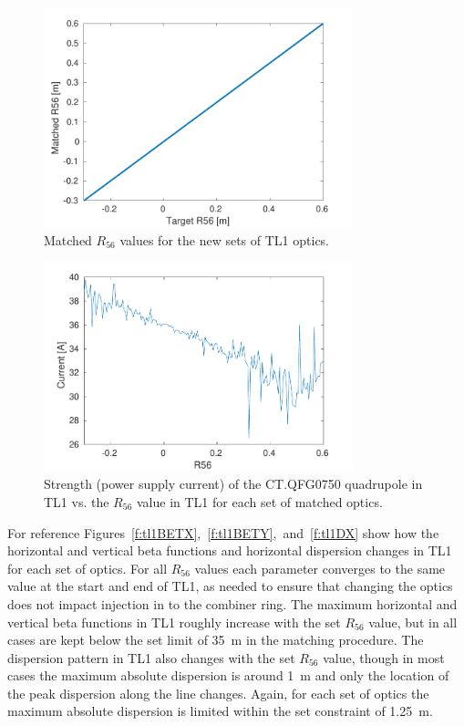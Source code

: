 \begin{figure}
  \centering
  \includegraphics[width=0.8\textwidth]{Figures/propagation/r56MatchedVsTarget}
  \caption{Matched \(R_{56}\) values for the new sets of TL1 optics.}
  \label{f:r56MatchedVsTarget}
\end{figure}

\begin{figure}
  \centering
  \includegraphics[width=0.8\textwidth]{Figures/propagation/CTQFG0750}
  \caption{Strength (power supply current) of the CT.QFG0750 quadrupole in TL1 vs. the \(R_{56}\) value in TL1 for each set of matched optics.}
  \label{f:CTQFG0750}
\end{figure}

For reference Figures~\ref{f:tl1BETX},~\ref{f:tl1BETY},~and~\ref{f:tl1DX} show how the horizontal and vertical beta functions and horizontal dispersion changes in TL1 for each set of optics. For all \(R_{56}\) values each parameter converges to the same value at the start and end of TL1, as needed to ensure that changing the optics does not impact injection in to the combiner ring. The maximum horizontal and vertical beta functions in TL1 roughly increase with the set \(R_{56}\) value, but in all cases are kept below the set limit of 35~m in the matching procedure. The dispersion pattern in TL1 also changes with the set \(R_{56}\) value, though in most cases the maximum absolute dispersion is around 1~m and only the location of the peak dispersion along the line changes. Again, for each set of optics the maximum absolute dispersion is limited within the set constraint of 1.25~m. 

